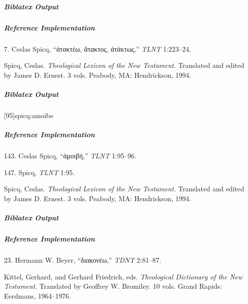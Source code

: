 \documentclass[a4paper]{article}
\newcommand{\textgreek}[1]{{\greekfont #1}}
\newenvironment{biboutput}{%
  \subparagraph{Biblatex Output}
}{\color{black}}
\newenvironment{refimp}{%
  \subparagraph{Reference Implementation}
  \color{reference-colour}
  \rm
}{\par\color{black}}
\begin{document}
\begin{biboutput}
\end{biboutput}

\begin{refimp}
  \hspace*{\bibindent}7. Ceslas Spicq, “\textgreek{ἀτακτέω, ἄτακτος, ἀτάκτως},”
  \emph{TLNT} 1:223–24.

  \hangindent\bibindent Spicq, Ceslas. \emph{Theological Lexicon of the New
  Testament.} Translated and edited by James D. Ernest. 3 vols. Peabody, MA:
  Hendrickson, 1994.

\end{refimp}

\begin{biboutput}
  [95]{spicq:amoibe}
\end{biboutput}

\begin{refimp}
  143. Ceslas Spicq, “\textgreek{ἀμοιβή},” \emph{TLNT} 1:95–96.

  147. Spicq, \emph{TLNT} 1:95.

  \hangindent\bibindent Spicq, Ceslas. \emph{Theological Lexicon of the New
  Testament.} Translated and edited by James D. Ernest. 3 vols. Peabody, MA:
  Hendrickson, 1994.

\end{refimp}

\begin{biboutput}
\end{biboutput}

\begin{refimp}
  \hspace*{\bibindent}23. Hermann W. Beyer, “\textgreek{διακονέω},” \emph{TDNT}
  2:81–87.

  \hangindent\bibindent Kittel, Gerhard, and Gerhard Friedrich, eds.
  \emph{Theological Dictionary of the New Testament.} Translated by Geoffrey
  W. Bromiley. 10 vols. Grand Rapids: Eerdmans, 1964–1976.

\end{refimp}
\end{document}
